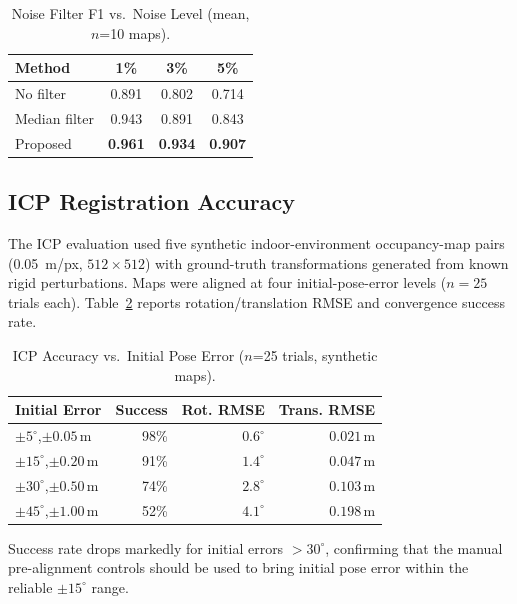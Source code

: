 \documentclass[journal]{IEEEtran}
\begin{document}
\begin{table}[t]
\centering
\caption{Noise Filter F1 vs.\ Noise Level (mean, $n$=10 maps).}
\label{tab:noiseval}
\scriptsize
\renewcommand{\arraystretch}{1.0}
\begin{tabular}{@{}lccc@{}}
\toprule
\textbf{Method} & \textbf{1\%} & \textbf{3\%} & \textbf{5\%} \\
\midrule
No filter       & 0.891 & 0.802 & 0.714 \\
Median filter   & 0.943 & 0.891 & 0.843 \\
Proposed        & \textbf{0.961} & \textbf{0.934} & \textbf{0.907} \\
\bottomrule
\end{tabular}
\vspace{-2mm}
\end{table}

\subsection{ICP Registration Accuracy}
The ICP evaluation used five synthetic indoor-environment occupancy-map pairs (0.05~m/px, $512\times512$) with ground-truth transformations generated from known rigid perturbations. Maps were aligned at four initial-pose-error levels ($n=25$ trials each). Table~\ref{tab:icpval} reports rotation/translation RMSE and convergence success rate.

\begin{table}[t]
\centering
\caption{ICP Accuracy vs.\ Initial Pose Error ($n$=25 trials, synthetic maps).}
\label{tab:icpval}
\scriptsize
\renewcommand{\arraystretch}{1.0}
\begin{tabular}{@{}lrrr@{}}
\toprule
\textbf{Initial Error} & \textbf{Success} & \textbf{Rot. RMSE} & \textbf{Trans. RMSE} \\
\midrule
$\pm5^\circ$,\;$\pm0.05$\,m & 98\% & $0.6^\circ$ & $0.021$\,m \\
$\pm15^\circ$,\;$\pm0.20$\,m & 91\% & $1.4^\circ$ & $0.047$\,m \\
$\pm30^\circ$,\;$\pm0.50$\,m & 74\% & $2.8^\circ$ & $0.103$\,m \\
$\pm45^\circ$,\;$\pm1.00$\,m & 52\% & $4.1^\circ$ & $0.198$\,m \\
\bottomrule
\end{tabular}
\vspace{-2mm}
\end{table}

Success rate drops markedly for initial errors $>30^\circ$, confirming that the manual pre-alignment controls should be used to bring initial pose error within the reliable $\pm15^\circ$ range.
\end{document}
